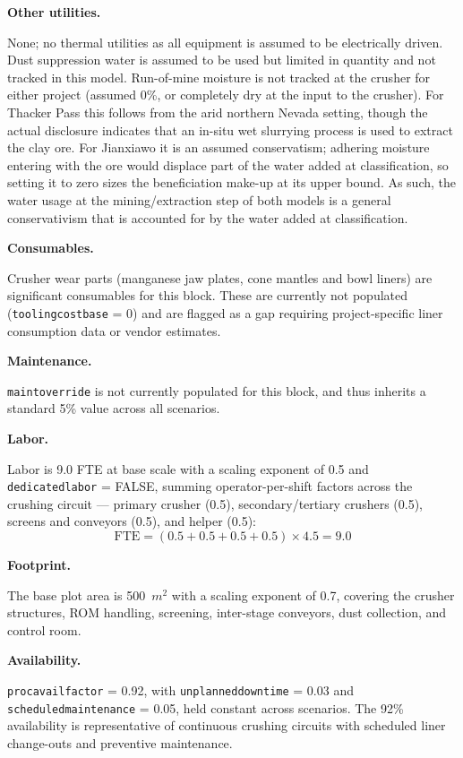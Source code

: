 \documentclass{article}
\renewcommand\_{\textunderscore\allowbreak}
\begin{document}
\clearpage
\medskip
\noindent\textbf{Other utilities.}\quad

None; no thermal utilities as all equipment is assumed to be electrically driven. Dust suppression water is assumed to be used but limited in quantity and not tracked in this model. Run-of-mine moisture is not tracked at the crusher for either project (assumed 0\%, or completely dry at the input to the crusher). For Thacker Pass this follows from the arid northern Nevada setting, though the actual disclosure indicates that an in-situ wet slurrying process is used to extract the clay ore. For Jianxiawo it is an assumed conservatism; adhering moisture entering with the ore would displace part of the water added at classification, so setting it to zero sizes the beneficiation make-up at its upper bound. As such, the water usage at the mining/extraction step of both models is a general conservativism that is accounted for by the water added at classification. 

\medskip
\noindent\textbf{Consumables.}\quad

Crusher wear parts (manganese jaw plates, cone mantles and bowl liners) are significant consumables for this block. These are currently not populated (\texttt{tooling\_cost\_base} = 0) and are flagged as a gap requiring project-specific liner consumption data or vendor estimates.


\medskip
\noindent\textbf{Maintenance.}\quad

\texttt{maint\_override} is not currently populated for this block, and thus inherits a standard 5\% value across all scenarios.

\medskip
\noindent\textbf{Labor.}\quad

Labor is 9.0 FTE at base scale with a scaling exponent of 0.5 and \texttt{dedicated\_labor} = FALSE, summing operator-per-shift factors across the crushing circuit --- primary crusher (0.5), secondary/tertiary crushers (0.5), screens and conveyors (0.5), and helper (0.5):
\[
	\text{FTE} = (0.5 + 0.5 + 0.5 + 0.5) \times 4.5 = 9.0
\]

\medskip
\noindent\textbf{Footprint.}\quad

The base plot area is 500~$\si{m^2}$ with a scaling exponent of 0.7, covering the crusher structures, ROM handling, screening, inter-stage conveyors, dust collection, and control room.

\medskip
\noindent\textbf{Availability.}\quad

\texttt{proc\_avail\_factor} = 0.92, with \texttt{unplanned\_downtime} = 0.03 and \texttt{scheduled\_maintenance} = 0.05, held constant across scenarios. The 92\% availability is representative of continuous crushing circuits with scheduled liner change-outs and preventive maintenance.
\end{document}
